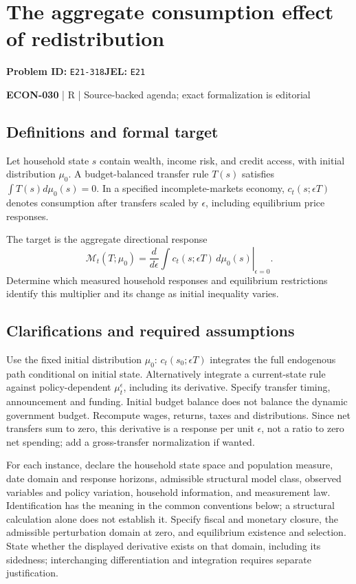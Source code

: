 \documentclass[11pt,a4paper]{article}
\begin{document}
\section*{The aggregate consumption effect of redistribution}
\textbf{Problem ID:} \texttt{E21-318}\quad \textbf{JEL:} \texttt{E21}\par
\label{problem:OP-0609}


\label{audited:ECON-030}

{\sffamily\small\color{muted}\textbf{ECON-030} | R | Source-backed agenda; exact formalization is editorial\par}

\subsection*{Definitions and formal target}

Let household state $s$ contain wealth, income risk, and credit access, with initial distribution $\mu_0$. A budget-balanced transfer rule $T(s)$ satisfies $\int T(s)d\mu_0(s)=0$. In a specified incomplete-markets economy, $c_t(s;\epsilon T)$ denotes consumption after transfers scaled by $\epsilon$, including equilibrium price responses.

The target is the aggregate directional response
\[
 \mathcal M_t(T;\mu_0)=
 \left.\frac{d}{d\epsilon}\int c_t(s;\epsilon T)\,d\mu_0(s)\right|_{\epsilon=0}.
\]
Determine which measured household responses and equilibrium restrictions identify this multiplier and its change as initial inequality varies.

\subsection*{Clarifications and required assumptions}

Use the fixed initial distribution \(\mu_0\): \(c_t(s_0;\epsilon T)\) integrates the full endogenous path conditional on initial state. Alternatively integrate a current-state rule against policy-dependent \(\mu_t^\epsilon\), including its derivative. Specify transfer timing, announcement and funding. Initial budget balance does not balance the dynamic government budget. Recompute wages, returns, taxes and distributions. Since net transfers sum to zero, this derivative is a response per unit \(\epsilon\), not a ratio to zero net spending; add a gross-transfer normalization if wanted.

For each instance, declare the household state space and population measure, date domain and response horizons, admissible structural model class, observed variables and policy variation, household information, and measurement law. Identification has the meaning in the common conventions below; a structural calculation alone does not establish it. Specify fiscal and monetary closure, the admissible perturbation domain at zero, and equilibrium existence and selection. State whether the displayed derivative exists on that domain, including its sidedness; interchanging differentiation and integration requires separate justification.
\end{document}
